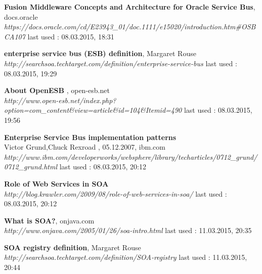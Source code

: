 \documentclass[12pt]{article}
\begin{document}
\begin{thebibliography}{56}
   	  
 	  	 
   \textbf{Fusion Middleware Concepts and Architecture for Oracle Service Bus}, docs.oracle\\
  \textit{    	  https://docs.oracle.com/cd/E23943\_01/doc.1111/e15020/introduction.htm\#OSBCA107
}
  \newline last used : 08.03.2015, 18:31 	 
   	     	  
   \textbf{enterprise service bus (ESB) definition}, Margaret Rouse\\
  \textit{ http://searchsoa.techtarget.com/definition/enterprise-service-bus}
  \newline last used : 08.03.2015, 19:29 	 
   	     	     	     	  
 	     	  
   \textbf{About OpenESB }, open-esb.net\\
  \textit{http://www.open-esb.net/index.php?option=com\_content\&view=article\&id=104\&Itemid=490}
  \newline last used : 08.03.2015, 19:56 	 
   	     	     	     	     	     	     	     	  
   	     
   \textbf{Enterprise Service Bus implementation patterns} \\ Victor Grund,Chuck Rexroad , 05.12.2007, ibm.com\\
  \textit{ http://www.ibm.com/developerworks/websphere/library/techarticles/0712\_grund/0712\_grund.html}
  \newline last used : 08.03.2015, 20:12 	   	     
   	     	     	     	 
 	    	     
   \textbf{Role of Web Services in SOA} \\
  \textit{ 	 http://blog.krawler.com/2009/08/role-of-web-services-in-soa/}
  \newline last used : 08.03.2015, 20:12 	   	     
   	     	     	     	 
   	  
     	     	     	 
   \textbf{What is SOA?}, onjava.com \\
  \textit{http://www.onjava.com/2005/01/26/soa-intro.html}
  \newline last used : 11.03.2015, 20:35
 	 
 	 
   \textbf{SOA registry definition}, Margaret Rouse\\
  \textit{http://searchsoa.techtarget.com/definition/SOA-registry}
  \newline last used : 11.03.2015, 20:44 	 
   	     	   

\end{thebibliography}
\end{document}
